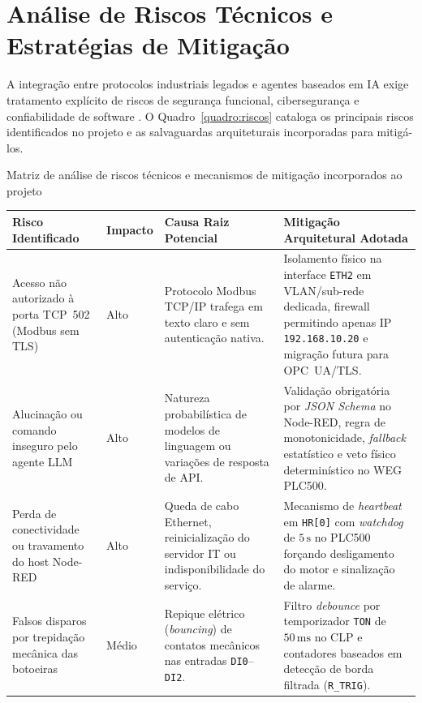 \section{Análise de Riscos Técnicos e Estratégias de Mitigação}
\label{sec:val_riscos}

A integração entre protocolos industriais legados e agentes baseados em IA exige tratamento explícito de riscos de segurança funcional, cibersegurança e confiabilidade de software \cite{stouffer_nist_ot, iec_62443}. O Quadro~\ref{quadro:riscos} cataloga os principais riscos identificados no projeto e as salvaguardas arquiteturais incorporadas para mitigá-los.

\begin{quadro}[htb]
  \centering
  \SingleSpacing
  \caption{Matriz de análise de riscos técnicos e mecanismos de mitigação incorporados ao projeto}
  \label{quadro:riscos}
  \footnotesize
  \begin{tabularx}{\textwidth}{|p{2.6cm}|p{1.3cm}|L|L|}
    \hline
    \textbf{Risco Identificado} & \textbf{Impacto} & \textbf{Causa Raiz Potencial} & \textbf{Mitigação Arquitetural Adotada} \\
    \hline
    Acesso não autorizado à porta TCP~502 (Modbus sem TLS) & Alto & Protocolo Modbus TCP/IP trafega em texto claro e sem autenticação nativa. & Isolamento físico na interface \texttt{ETH2} em VLAN/sub-rede dedicada, firewall permitindo apenas IP \texttt{192.168.10.20} e migração futura para OPC~UA/TLS. \\
    \hline
    Alucinação ou comando inseguro pelo agente LLM & Alto & Natureza probabilística de modelos de linguagem ou variações de resposta de API. & Validação obrigatória por \textit{JSON Schema} no Node-RED, regra de monotonicidade, \textit{fallback} estatístico e veto físico determinístico no WEG PLC500. \\
    \hline
    Perda de conectividade ou travamento do host Node-RED & Alto & Queda de cabo Ethernet, reinicialização do servidor IT ou indisponibilidade do serviço. & Mecanismo de \textit{heartbeat} em \texttt{HR[0]} com \textit{watchdog} de $5\,\text{s}$ no PLC500 forçando desligamento do motor e sinalização de alarme. \\
    \hline
    Falsos disparos por trepidação mecânica das botoeiras & Médio & Repique elétrico (\textit{bouncing}) de contatos mecânicos nas entradas \texttt{DI0}--\texttt{DI2}. & Filtro \textit{debounce} por temporizador \texttt{TON} de $50\,\text{ms}$ no CLP e contadores baseados em detecção de borda filtrada (\texttt{R\_TRIG}). \\

\end{tabularx}
\end{quadro}
